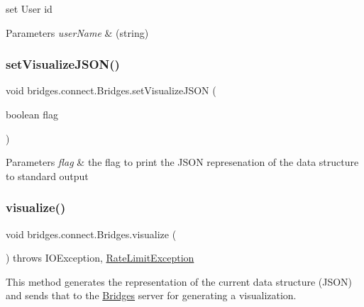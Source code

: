 set User id


\begin{DoxyParams}{Parameters}
{\em user\+Name} & (string) \\
\hline
\end{DoxyParams}
\mbox{\label{classbridges_1_1connect_1_1_bridges_aa502aa32a9ac482da9c8455c6810b64d}} 
\subsubsection{\texorpdfstring{set\+Visualize\+J\+S\+O\+N()}{setVisualizeJSON()}}
{\footnotesize\ttfamily void bridges.\+connect.\+Bridges.\+set\+Visualize\+J\+S\+ON (\begin{DoxyParamCaption}\item[{boolean}]{flag }\end{DoxyParamCaption})}


\begin{DoxyParams}{Parameters}
{\em flag} & the flag to print the J\+S\+ON represenation of the data structure to standard output \\
\hline
\end{DoxyParams}
\mbox{\label{classbridges_1_1connect_1_1_bridges_a1853d64ffb8675ba2ec227a2b819cd24}} 
\subsubsection{\texorpdfstring{visualize()}{visualize()}}
{\footnotesize\ttfamily void bridges.\+connect.\+Bridges.\+visualize (\begin{DoxyParamCaption}{ }\end{DoxyParamCaption}) throws I\+O\+Exception, \mbox{\hyperlink{classbridges_1_1validation_1_1_rate_limit_exception}{Rate\+Limit\+Exception}}}

This method generates the representation of the current data structure (J\+S\+ON) and sends that to the \mbox{\hyperlink{classbridges_1_1connect_1_1_bridges}{Bridges}} server for generating a visualization.


